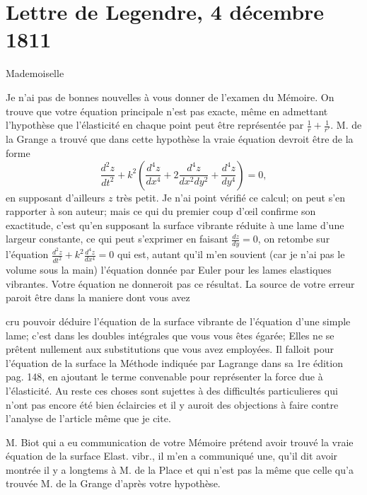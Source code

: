 \documentclass[11pt,a4paper]{article}
\begin{document}

\section{Lettre de Legendre, 4 décembre 1811}

Mademoiselle

Je n'ai pas de bonnes nouvelles à vous donner de l'examen du Mémoire. On
trouve que votre équation principale n'est pas exacte, même en admettant
l'hypothèse que l'élasticité en chaque point peut être représentée par
$\frac{1}{r} + \frac{1}{r'}$. M. de la Grange a trouvé que dans cette
hypothèse la vraie équation devroit être de la forme
\[
\frac{d^2 z}{dt^2}
+ k^2\left(\frac{d^4 z}{dx^4} + 2\frac{d^4 z}{dx^2 dy^2}
+ \frac{d^4 z}{dy^4}\right) = 0,
\]
en supposant d'ailleurs $z$ très petit. Je n'ai point vérifié ce calcul; on
peut s'en rapporter à son auteur; mais ce qui du premier coup d'œil confirme
son exactitude, c'est qu'en supposant la surface vibrante réduite à une lame
d'une largeur constante, ce qui peut s'exprimer en faisant
$\frac{dz}{dy} = 0$, on retombe sur l'équation
$\frac{d^2 z}{dt^2} + k^2 \frac{d^4 z}{dx^4} = 0$ qui est, autant qu'il m'en
souvient (car je n'ai pas le volume sous la main) l'équation donnée par Euler
pour les lames elastiques vibrantes. Votre équation ne donneroit pas ce
résultat. La source de votre erreur \struck{\ill{}} paroit être dans la
maniere dont vous avez


cru pouvoir déduire l'équation de la surface vibrante de l'équation d'une
simple lame; c'est dans les doubles intégrales que vous vous êtes égarée;
Elles ne se prêtent nullement aux substitutions que vous avez employées. Il
falloit pour l'équation de la surface  la Méthode indiquée
par Lagrange dans sa 1re édition pag. 148, en ajoutant le terme convenable
pour représenter la force due à l'élasticité. Au reste ces choses sont
sujettes à des difficultés particulieres qui n'ont pas encore été bien
éclaircies et il y auroit  des objections à faire contre
l'analyse de l'article même que je cite.

M. Biot qui a eu communication de votre Mémoire prétend avoir trouvé la
vraie équation de la surface Elast. vibr., il m'en a communiqué une, qu'il
dit avoir montrée il y a longtems à M. de la Place et qui n'est pas la même
que celle qu'a trouvée M. de la Grange d'après votre hypothèse.
\end{document}
